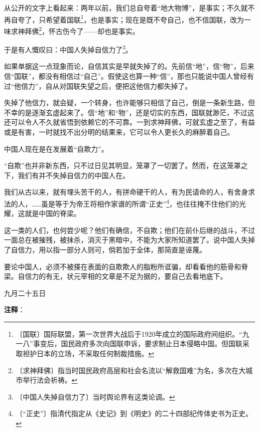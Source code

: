 \documentclass[12pt,UTF-8,openany]{ctexbook}
\begin{document}
\begin{normalsize}
    
    从公开的文字上看起来：两年以前，我们总自夸着“地大物博”，是事实；不久就不再自夸了，只希望着国联\footnote{〔国联〕国际联盟，第一次世界大战后于1920年成立的国际政府间组织。“九一八”事变后，国民政府多次向国联申诉，要求制止日本侵略中国。但国联采取袒护日本的立场，不采取任何制裁措施。}，也是事实；现在是既不夸自己，也不信国联，改为一味求神拜佛\footnote{〔求神拜佛〕指当时国民政府高层和社会名流以“解救国难”为名，多次在大城市举行法会祈祷。}，怀古伤今了——却也是事实。
    
    于是有人慨叹曰：中国人失掉自信力了\footnote{〔中国人失掉自信力了〕当时舆论界有这类论调。}。
    
    如果单据这一点现象而论，自信其实是早就失掉了的。先前信“地”，信“物”，后来信“国联”，都没有相信过“自己”。假使这也算一种“信”，那也只能说中国人曾经有过“他信力”，自从对国联失望之后，便把这他信力都失掉了。
    
    失掉了他信力，就会疑，一个转身，也许能够只相信了自己，倒是一条新生路，但不幸的是逐渐玄虚起来了。信“地”和“物”，还是切实的东西，国联就渺茫，不过这还可以令人不久就省悟到依赖它的不可靠。一到求神拜佛，可就玄虚之至了，有益或是有害，一时就找不出分明的结果来，它可以令人更长久的麻醉着自己。
    
    中国人现在是在发展着“自欺力”。
    
    “自欺”也并非新东西，只不过日见其明显，笼罩了一切罢了。然而，在这笼罩之下，我们有并不失掉自信力的中国人在。
    
    我们从古以来，就有埋头苦干的人，有拼命硬干的人，有为民请命的人，有舍身求法的人，……虽是等于为帝王将相作家谱的所谓“正史”\footnote{〔“正史”〕指清代指定从《史记》到《明史》的二十四部纪传体史书为正史。}，也往往掩不住他们的光耀，这就是中国的脊梁。
    
    这一类的人们，也何尝少呢？他们有确信，不自欺；他们在前仆后继的战斗，不过一面总在被摧残，被抹杀，消灭于黑暗中，不能为大家所知道罢了。说中国人失掉了自信力，用以指一部分人则可，倘若加于全体，那简直是诬蔑。
    
    要论中国人，必须不被搽在表面的自欺欺人的脂粉所诓骗，却看看他的筋骨和脊梁。自信力的有无，状元宰相的文章是不足为据的，要自己去看地底下。
    
    \hfill 九月二十五日
    
\end{normalsize}


\newpage

\textbf{注释}：

\vspace{-1em}
\end{document}
